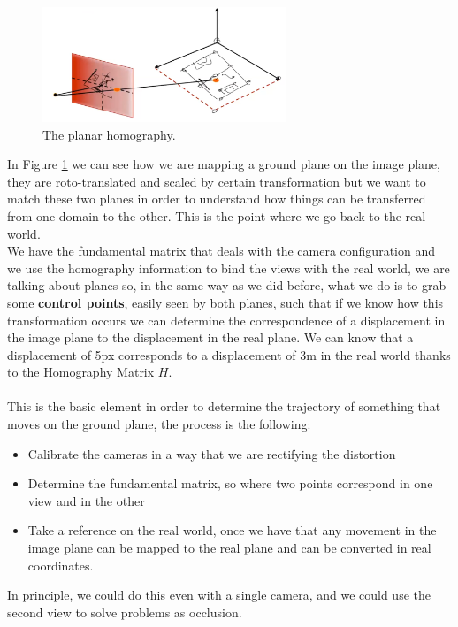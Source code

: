 \begin{figure}[H]
    \centering
    \includegraphics[width=0.65\textwidth]{Figures/homo.png}
    \caption{The planar homography.}
    \label{fig:homo}
\end{figure}

In Figure \ref{fig:homo} we can see how we are mapping a ground plane on the image plane, they are roto-translated and scaled by certain transformation but we want to match these two planes in order to understand how things can be transferred from one domain to the other. This is the point where we go back to the real world.
\\
We have the fundamental matrix that deals with the camera configuration and we use the homography information to bind the views with the real world, we are talking about planes so, in the same way as we did before, what we do is to grab some \textbf{control points}, easily seen by both planes, such that if we know how this transformation occurs we can determine the correspondence of a displacement in the image plane to the displacement in the real plane. We can know that a displacement of 5px corresponds to a displacement of 3m in the real world thanks to the Homography Matrix \(H\).
\\\\
This is the basic element in order to determine the trajectory of something that moves on the ground plane, the process is the following:
\begin{itemize}
    \item Calibrate the cameras in a way that we are rectifying the distortion
    \item Determine the fundamental matrix, so where two points correspond in one view and in the other
    \item Take a reference on the real world, once we have that any movement in the image plane can be mapped to the real plane and can be converted in real coordinates.
\end{itemize}

In principle, we could do this even with a single camera, and we could use the second view to solve problems as occlusion. 

